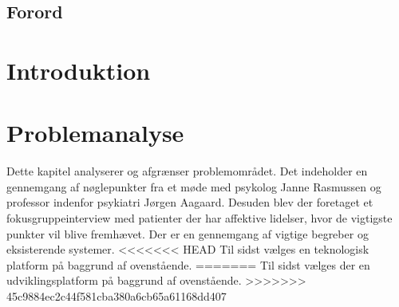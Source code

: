%
%
%
%
% 



\pagestyle{empty} %

%
\listoftodos
\cleardoublepage

\cleardoublepage

\section*{Forord}

\cleardoublepage

\pagestyle{fancy} %
\setcounter{tocdepth}{2}
\setcounter{secnumdepth}{3}
\tableofcontents

%
\cleardoublepage

\chapter*{Introduktion}


\chapter{Problemanalyse}
Dette kapitel analyserer og afgrænser problemområdet.
Det indeholder en gennemgang af nøglepunkter fra et møde med psykolog Janne Rasmussen og professor indenfor psykiatri Jørgen Aagaard.
Desuden blev der foretaget et fokusgruppeinterview med patienter der har affektive lidelser, hvor de vigtigste punkter vil blive fremhævet.
Der er en gennemgang af vigtige begreber og eksisterende systemer.
<<<<<<< HEAD
Til sidst vælges en teknologisk platform på baggrund af ovenstående.
=======
Til sidst vælges der en udviklingsplatform på baggrund af ovenstående.
>>>>>>> 45c9884ec2c44f581cba380a6cb65a61168dd407

